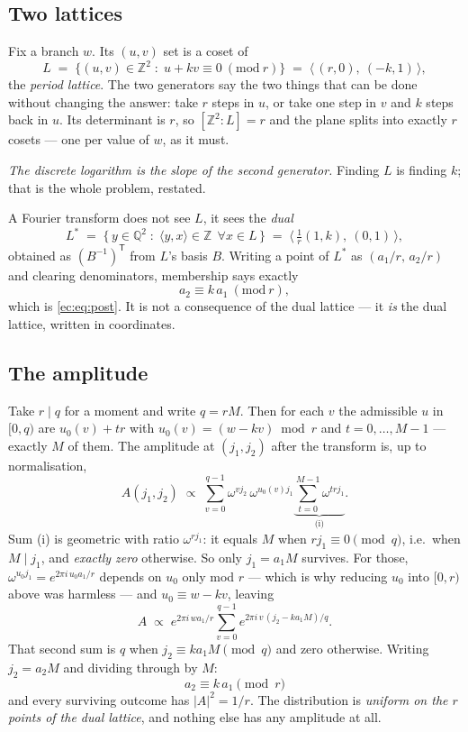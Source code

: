 \subsection{Two lattices}

Fix a branch $w$. Its $(u,v)$ set is a coset of
\[
L \;=\; \{(u,v)\in\mathbb{Z}^2 \;:\; u+kv\equiv 0 \ (\mathrm{mod}\ r)\}
\;=\; \big\langle\, (r,0),\ (-k,1) \,\big\rangle ,
\]
the \emph{period lattice}. The two generators say the two things that can be done without changing
the answer: take $r$ steps in $u$, or take one step in $v$ and $k$ steps back in $u$. Its
determinant is $r$, so $[\mathbb{Z}^2 : L]=r$ and the plane splits into exactly $r$ cosets --- one
per value of $w$, as it must.

\emph{The discrete logarithm is the slope of the second generator.} Finding $L$ is finding $k$;
that is the whole problem, restated.

A Fourier transform does not see $L$, it sees the \emph{dual}
\[
L^{*} \;=\; \{\,y\in\mathbb{Q}^2 \;:\; \langle y,x\rangle\in\mathbb{Z}\ \ \forall x\in L\,\}
\;=\; \big\langle\, \tfrac1r(1,k),\ (0,1) \,\big\rangle ,
\]
obtained as $(B^{-1})^{\mathsf T}$ from $L$'s basis $B$. Writing a point of $L^{*}$ as
$(a_1/r,\,a_2/r)$ and clearing denominators, membership says exactly
\[
a_2 \equiv k\,a_1 \ (\mathrm{mod}\ r) ,
\]
which is \eqref{ec:eq:post}. It is not a consequence of the dual lattice --- it \emph{is} the dual
lattice, written in coordinates.

\subsection{The amplitude}

Take $r\mid q$ for a moment and write $q=rM$. Then for each $v$ the admissible $u$ in $[0,q)$ are
$u_0(v)+tr$ with $u_0(v)=(w-kv)\bmod r$ and $t=0,\dots,M-1$ --- exactly $M$ of them. The amplitude
at $(j_1,j_2)$ after the transform is, up to normalisation,
\[
A(j_1,j_2)\;\propto\;\sum_{v=0}^{q-1}\omega^{v j_2}\,\omega^{u_0(v)j_1}
\underbrace{\sum_{t=0}^{M-1}\omega^{t r j_1}}_{\text{(i)}} .
\]
Sum (i) is geometric with ratio $\omega^{rj_1}$: it equals $M$ when $rj_1\equiv 0 \pmod q$, i.e.\
when $M \mid j_1$, and \emph{exactly zero} otherwise. So only $j_1=a_1M$ survives. For those,
$\omega^{u_0 j_1}=e^{2\pi i\,u_0 a_1/r}$ depends on $u_0$ only mod $r$ --- which is why reducing
$u_0$ into $[0,r)$ above was harmless --- and $u_0\equiv w-kv$, leaving
\[
A \;\propto\; e^{2\pi i\,w a_1/r}\sum_{v=0}^{q-1} e^{2\pi i\,v\,(j_2-k a_1 M)/q} .
\]
That second sum is $q$ when $j_2\equiv ka_1M \pmod q$ and zero otherwise. Writing $j_2=a_2M$ and
dividing through by $M$:
\[
\boxed{\;a_2\equiv k\,a_1 \pmod r\;}
\]
and every surviving outcome has $|A|^2=1/r$. The distribution is \emph{uniform on the $r$ points of
the dual lattice}, and nothing else has any amplitude at all.

